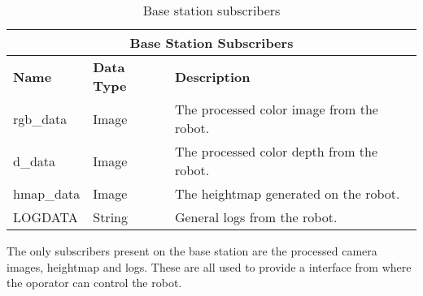     \begin{table}[h]
        \centering
        \begin{tabularx}{\textwidth}{| l | l | X |}
            \hline
            \multicolumn{3}{|c|}{\textbf{Base Station Subscribers}} \\ \hline
            \textbf{Name} & \textbf{Data Type} & \textbf{Description} \\ \hline
            rgb\_data & Image & The processed color image from the robot. \\ \hline
            d\_data & Image & The processed color depth from the robot. \\ \hline
            hmap\_data & Image & The heightmap generated on the robot. \\ \hline
            LOGDATA & String & General logs from the robot. \\ \hline
        \end{tabularx}
        \caption{Base station subscribers}
        \label{tab:base_subs}
    \end{table}
    
    \noindent
    The only subscribers present on the base station are the processed camera images, heightmap and logs. These are all used to provide a interface from where
    the oporator can control the robot.

